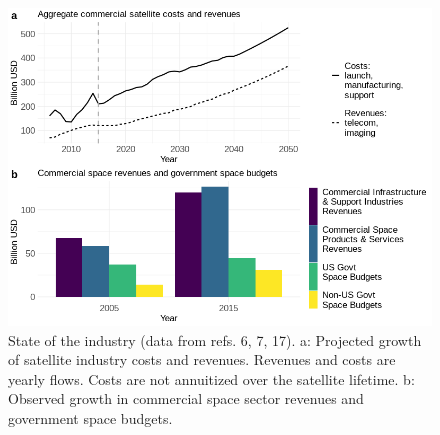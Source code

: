 \documentclass[9pt,twocolumn,twoside,lineno]{pnas-new}
\begin{document}
%
%

\begin{figure}%
\centering
\includegraphics[width=.8\linewidth]{main_text_figure_1.png}
\caption{State of the industry (data from refs. 6, 7, 17). a: Projected growth of satellite industry costs and revenues.  Revenues and costs are yearly flows.  Costs are not annuitized over the satellite lifetime. b: Observed growth in commercial space sector revenues and government space budgets.}
\label{fig:MT1}
\end{figure}
\end{document}
